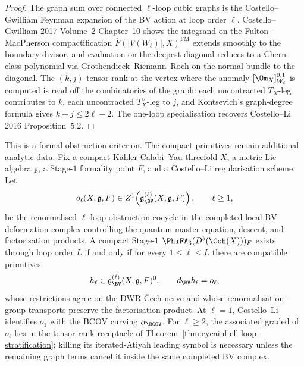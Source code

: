 \begin{proof}
The graph sum over connected $\ell$-loop cubic graphs is the
Costello--Gwilliam Feynman expansion of the BV action at loop
order $\ell$. Costello--Gwilliam 2017 Volume~2 Chapter~10 shows
the integrand on the Fulton--MacPherson compactification
$\overline{F}(|V(W_\ell)|, X)^{\mathrm{FM}}$ extends smoothly to
the boundary divisor, and evaluation on the deepest diagonal reduces
to a Chern-class polynomial via Grothendieck--Riemann--Roch on the
normal bundle to the diagonal. The $(k, j)$-tensor rank at the vertex
where the anomaly $[\Om_X]^{0,1}_{W_\ell}$ is computed is
read off the combinatorics of the graph: each uncontracted $T_X$-leg
contributes to $k$, each uncontracted $T_X^\vee$-leg to $j$, and
Kontsevich's graph-degree formula gives $k + j \leq 2\ell - 2$.
The one-loop specialisation recovers Costello--Li 2016 Proposition~5.2.
\end{proof}

\begin{proposition}
\label{prop:cycainf-compact-higher-loop-primitive-criterion}
This is a formal obstruction criterion. The compact primitives remain
additional analytic data.
Fix a compact K\"ahler Calabi--Yau threefold $X$, a metric Lie algebra
$\mathfrak g$, a Stage-$1$ formality point $F$, and a Costello--Li
regularisation scheme. Let
\[
 o_\ell(X,\mathfrak g,F)
 \in
 Z^1\!\left(\mathfrak g_{\BV}^{(\ell)}(X,\mathfrak g,F)\right),
 \qquad \ell\geq 1,
\]
be the renormalised $\ell$-loop obstruction cocycle in the completed
local BV deformation complex controlling the quantum master equation,
descent, and factorisation products. A compact Stage-$1$
$\PhiFA_3(D^b(\Coh(X)))_F$ exists through loop order $L$ if and only if
for every $1\leq \ell\leq L$ there are compatible primitives
\[
 h_\ell\in \mathfrak g_{\BV}^{(\ell)}(X,\mathfrak g,F)^0,
 \qquad
 d_{\BV}h_\ell=o_\ell,
\]
whose restrictions agree on the DWR \v{C}ech nerve and whose
renormalisation-group transports preserve the factorisation product.
At $\ell=1$, Costello--Li identifies $o_1$ with the BCOV curving
$\alpha_{\BCOV}$. For $\ell\geq2$, the associated graded of $o_\ell$
lies in the tensor-rank receptacle of
Theorem~\ref{thm:cycainf-ell-loop-stratification}; killing its
iterated-Atiyah leading symbol is necessary unless the remaining graph
terms cancel it inside the same completed BV complex.
\end{proposition}

